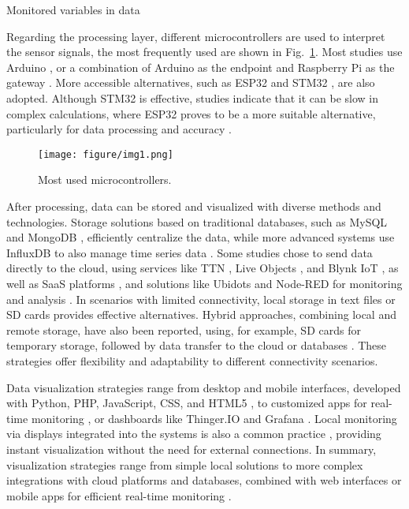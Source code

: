\begin{table}[b!]
\caption{\label{tab:variaveis}Monitored variables in data}
\end{table}

Regarding the processing layer, different microcontrollers are used to interpret the sensor signals, the most frequently used are shown in Fig.~\ref{fig:grafico1}. Most studies use Arduino \cite{2,4,13,17,27,29}, or a combination of Arduino as the endpoint and Raspberry Pi as the gateway \cite{5,24,26,28}. More accessible alternatives, such as ESP32 \cite{8,20,22, 23} and STM32 \cite{11,15,16,25}, are also adopted. Although STM32 is effective, studies indicate that it can be slow in complex calculations, where ESP32 proves to be a more suitable alternative, particularly for data processing and accuracy \cite{16}.

\begin{figure}[t]
    \centering
    \texttt{[image: figure/img1.png]}
    \caption{Most used microcontrollers.}
    \label{fig:grafico1}
\end{figure}

After processing, data can be stored and visualized with diverse methods and technologies. Storage solutions based on traditional databases, such as MySQL \cite{1,7,22} and MongoDB \cite{5}, efficiently centralize the data, while more advanced systems use InfluxDB to also manage time series data \cite{9,28}. Some studies chose to send data directly to the cloud, using services like TTN \cite{3,17}, Live Objects \cite{8}, and Blynk IoT \cite{24}, as well as SaaS platforms \cite{8}, and solutions like Ubidots and Node-RED for monitoring and analysis \cite{9}. In scenarios with limited connectivity, local storage in text files \cite{3,13} or SD cards \cite{12,16} provides effective alternatives. Hybrid approaches, combining local and remote storage, have also been reported, using, for example, SD cards for temporary storage, followed by data transfer to the cloud or databases \cite{12,16,22}. These strategies offer flexibility and adaptability to different connectivity scenarios.

Data visualization strategies range from desktop and mobile interfaces, developed with Python, PHP, JavaScript, CSS, and HTML5 \cite{1,2,5,15}, to customized apps for real-time monitoring \cite{3,20,23,27}, or dashboards like Thinger.IO \cite{13} and Grafana \cite{9,28}. Local monitoring via displays integrated into the systems is also a common practice \cite{4,11,12,16,23,25,29}, providing instant visualization without the need for external connections. In summary, visualization strategies range from simple local solutions to more complex integrations with cloud platforms and databases, combined with web interfaces or mobile apps for efficient real-time monitoring \cite{1,3,5,7,9,17,24}.

